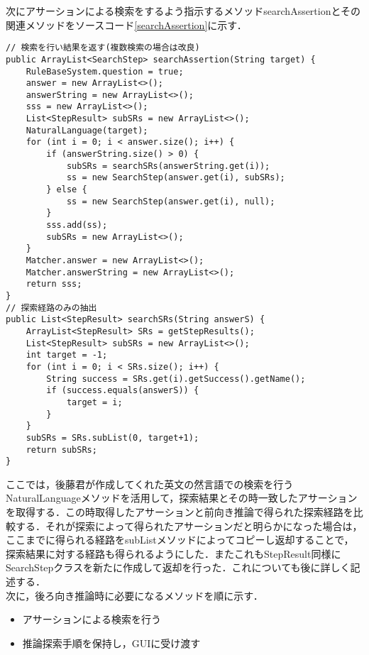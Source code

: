 \documentclass[12pt]{jarticle}
\begin{document}
次にアサーションによる検索をするよう指示するメソッドsearchAssertionとその関連メソッドをソースコード\ref{searchAssertion}に示す．
\begin{lstlisting}[caption=searchAssertionメソッド,label=searchAssertion]
// 検索を行い結果を返す(複数検索の場合は改良)
public ArrayList<SearchStep> searchAssertion(String target) {
	RuleBaseSystem.question = true;
	answer = new ArrayList<>();
	answerString = new ArrayList<>();
	sss = new ArrayList<>();
	List<StepResult> subSRs = new ArrayList<>();
	NaturalLanguage(target);
	for (int i = 0; i < answer.size(); i++) {
		if (answerString.size() > 0) {
			subSRs = searchSRs(answerString.get(i));
			ss = new SearchStep(answer.get(i), subSRs);
		} else {
			ss = new SearchStep(answer.get(i), null);
		}
		sss.add(ss);
		subSRs = new ArrayList<>();
	}
	Matcher.answer = new ArrayList<>();
	Matcher.answerString = new ArrayList<>();
	return sss;
}
// 探索経路のみの抽出
public List<StepResult> searchSRs(String answerS) {
	ArrayList<StepResult> SRs = getStepResults();
	List<StepResult> subSRs = new ArrayList<>();
	int target = -1;
	for (int i = 0; i < SRs.size(); i++) {
		String success = SRs.get(i).getSuccess().getName();
		if (success.equals(answerS)) {
			target = i;
		}
	}
	subSRs = SRs.subList(0, target+1);
	return subSRs;
}
\end{lstlisting}
ここでは，後藤君が作成してくれた英文の然言語での検索を行うNaturalLanguageメソッドを活用して，探索結果とその時一致したアサーションを取得する．この時取得したアサーションと前向き推論で得られた探索経路を比較する．それが探索によって得られたアサーションだと明らかになった場合は，ここまでに得られる経路をsubListメソッドによってコピーし返却することで，探索結果に対する経路も得られるようにした．またこれもStepResult同様にSearchStepクラスを新たに作成して返却を行った．これについても後に詳しく記述する．\\

次に，後ろ向き推論時に必要になるメソッドを順に示す．
\begin{itemize}
	\item アサーションによる検索を行う
	\item 推論探索手順を保持し，GUIに受け渡す
\end{itemize}
\end{document}
